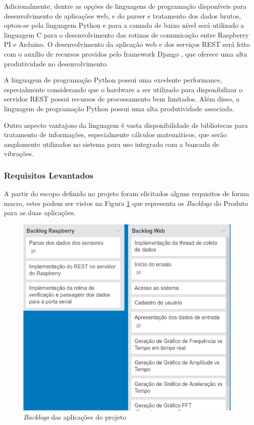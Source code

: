 Adicionalmente, dentre as opções de linguagens de programação disponíveis para desenvolvimento de aplicações web, e do parser e tratamento dos dados brutos, optou-se pela linguagem Python e para a camada de baixo nível será utilizado a linguagem C para o desenvolvimento  das rotinas de comunicação entre Raspberry PI e Arduino. O desenvolvimento da aplicação web e dos serviços REST será feito com o auxílio de recursos providos pelo framework Django \footnotemark, que oferece uma alta produtividade no desenvolvimento.

A linguagem de programação Python possui uma excelente performance, especialmente considerando que o hardware a ser utilizado para disponibilizar o servidor REST possui recursos de processamento bem limitados. Além disso, a linguagem de programação Python possui uma alta produtividade associada.

Outro aspecto vantajoso da linguagem é vasta disponibilidade de bibliotecas para tratamento de informações, especialmente cálculos matemáticos, que serão amplamente utilizados no sistema para uso integrado com a bancada de vibrações.
\newpage
\subsubsection*{\textbf{Requisitos Levantados}}
A partir do escopo definido no projeto foram elicitados alguns requisitos de forma macro, estes podem ser vistos na Figura \ref{backlog_produto} que representa os \textit{Backlogs} do Produto para as duas aplicações.

\begin{figure}[H]
\centering
\label{backlog_produto}
\includegraphics[keepaspectratio=true,scale=0.55]	{figuras/backlog_produto.png}
\caption{\textit{Backlogs} das aplicações do projeto}
\end{figure}

